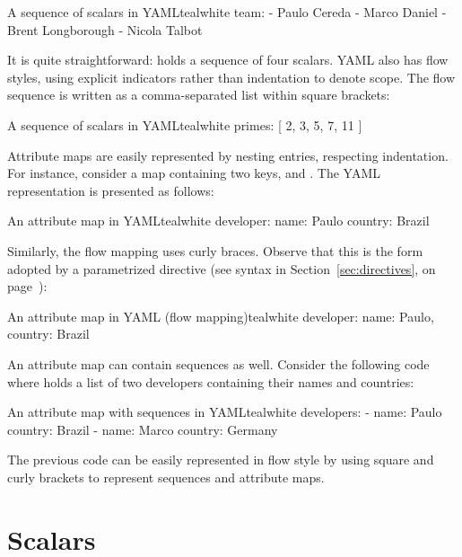 \begin{codebox}{A sequence of scalars in YAML}{teal}{\icnote}{white}
team:
- Paulo Cereda
- Marco Daniel
- Brent Longborough
- Nicola Talbot
\end{codebox}

It is quite straightforward:  holds a sequence of four scalars. \gls{YAML} also has flow styles, using explicit indicators rather than indentation to denote scope. The flow sequence is written as a comma-separated list within square brackets:

\begin{codebox}{A sequence of scalars in YAML}{teal}{\icnote}{white}
primes: [ 2, 3, 5, 7, 11 ]
\end{codebox}

Attribute maps are easily represented by nesting entries, respecting indentation. For instance, consider a map  containing two keys,  and . The \gls{YAML} representation is presented as follows:

\begin{codebox}{An attribute map in YAML}{teal}{\icnote}{white}
developer:
 name: Paulo
 country: Brazil
\end{codebox}

Similarly, the flow mapping uses curly braces. Observe that this is the form adopted by a parametrized directive (see syntax in Section~\ref{sec:directives}, on page~\pageref{sec:directives}):

\begin{codebox}{An attribute map in YAML (flow mapping)}{teal}{\icnote}{white}
developer: { name: Paulo, country: Brazil }
\end{codebox}

An attribute map can contain sequences as well. Consider the following code where  holds a list of two developers containing their names and countries:

\begin{codebox}{An attribute map with sequences in YAML}{teal}{\icnote}{white}
developers:
- name: Paulo
  country: Brazil
- name: Marco
  country: Germany
\end{codebox}

The previous code can be easily represented in flow style by using square and curly brackets to represent sequences and attribute maps.

\section{Scalars}
\label{sec:yamlscalars}

